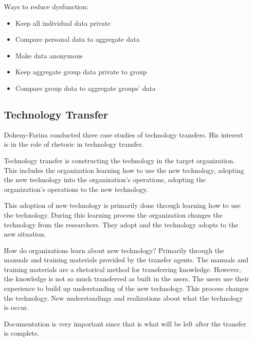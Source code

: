 Ways to reduce dysfunction:
\begin{itemize}
\item{Keep all individual data private}
\item{Compare personal data to aggregate data}
\item{Make data anonymous}
\item{Keep aggregate group data private to group}
\item{Compare group data to aggregate groups' data}
\end{itemize}

\subsection{Technology Transfer}

Doheny-Farina conducted three case studies of technology transfers.  His
interest is in the role of rhetoric in technology transfer.     \cite{Doheny92} 

Technology transfer is constructing the technology in the target
organization.   This includes the organization learning how to use the new
technology, adopting the new technology into the organization's
operations, adopting the organization's operations to the new technology.  

This adoption of new technology is primarily done through learning how to
use the technology.  During this learning process the organization changes
the technology from the researchers.  They adopt and the technology adopts
to the new situation.

How do organizations learn about new technology?  Primarily through the
manuals and training materials provided by the transfer agents.  The
manuals and training materials are a rhetorical method for transferring
knowledge.  However, the knowledge is not so much transferred as built in
the users.  The users use their experience to build up understanding of the
new technology.  This process changes the technology.  New understandings
and realizations about what the technology is occur.

Documentation is very important since that is what will be left after the
transfer is complete.  



